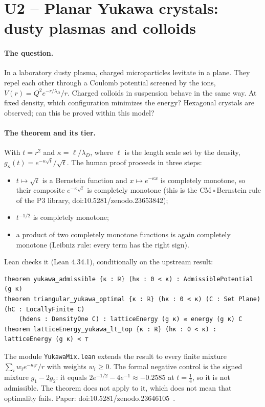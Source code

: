 \section{U2 -- Planar Yukawa crystals: dusty plasmas and colloids}\label{ch5:U2}

\paragraph{The question.} In a laboratory dusty plasma, charged microparticles levitate in a plane.
They repel each other through a Coulomb potential screened by the ions, $V(r)=Q^2e^{-r/\lambda_D}/r$. Charged
colloids in suspension behave in the same way. At fixed density, which configuration minimizes the energy?
Hexagonal crystals are observed; can this be proved within this model?

\paragraph{The theorem and its tier.} With $t=r^2$ and $\kappa=\ell/\lambda_D$, where $\ell$ is the length
scale set by the density, $g_\kappa(t)=e^{-\kappa\sqrt t}/\sqrt t$. The human proof \tierC{} proceeds in
three steps:
\begin{itemize}
\item $t\mapsto\sqrt t$ is a Bernstein function and $x\mapsto e^{-\kappa x}$ is completely monotone,
so their composite $e^{-\kappa\sqrt t}$ is completely monotone (this is the CM\,$\circ$\,Bernstein rule of the P3 library, doi:10.5281/zenodo.23653842);
\item $t^{-1/2}$ is completely monotone;
\item a product of two completely monotone functions is again completely monotone (Leibniz rule: every term has the
right sign).
\end{itemize}
Lean checks it \tierA{} (Lean 4.34.1), conditionally on the upstream result:
\begin{leanbox}
\begin{lstlisting}[language=Lean]
theorem yukawa_admissible {κ : ℝ} (hκ : 0 < κ) : AdmissiblePotential (g κ)
theorem triangular_yukawa_optimal {κ : ℝ} (hκ : 0 < κ) (C : Set Plane) (hC : LocallyFinite C)
    (hdens : DensityOne C) : latticeEnergy (g κ) ≤ energy (g κ) C
theorem latticeEnergy_yukawa_lt_top {κ : ℝ} (hκ : 0 < κ) : latticeEnergy (g κ) < ⊤
\end{lstlisting}
\end{leanbox}
The module \texttt{YukawaMix.lean} extends the result to every finite mixture $\sum_iw_ie^{-\kappa_ir}/r$ with weights
$w_i\ge0$. The formal negative control is the signed mixture $g_1-2g_2$: it equals $2e^{-1/2}-4e^{-1}\approx-0.2585$
at $t=\tfrac14$, so it is not admissible. The theorem does not apply to it, which does not mean that
optimality fails. Paper: doi:10.5281/zenodo.23646105~\cite{ch2yuk}.

